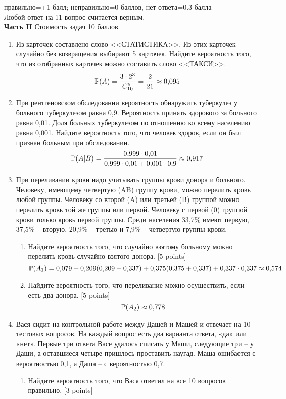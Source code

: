 \documentclass[pdftex,12pt,a4paper]{article}
\begin{document}
правильно=+1 балл; неправильно=0 баллов, нет ответа=0.3 балла \\
Любой ответ на 11 вопрос считается верным. \\

\pagebreak \textbf{Часть II} Стоимость задач 10 баллов. \\

\begin{enumerate}
\item Из карточек составлено слово <<СТАТИСТИКА>>. Из этих карточек случайно без возвращения  выбирают 5 карточек. Найдите вероятность того, что из отобранных карточек можно составить слово <<ТАКСИ>>.
\begin{equation}
\P(A)=\frac{3\cdot 2^3}{C_{10}^{5}}=\frac{2}{21}\approx 0{,}095
\end{equation}

\item При рентгеновском обследовании вероятность обнаружить туберкулез у больного туберкулезом равна 0{,}9. Вероятность принять здорового за больного равна 0{,}01. Доля больных туберкулезом по отношению ко всему населению равна 0{,}001. Найдите вероятность того, что человек здоров, если он был признан больным при обследовании.
\begin{equation}
\P(A|B)=\frac{0{,}999\cdot 0{,}01}{0{,}999\cdot 0{,}01+0{,}001\cdot 0{,}9}\approx 0{,}917
\end{equation}
\item При переливании крови надо учитывать группы крови донора и больного. Человеку, имеющему четвертую (AB) группу крови, можно перелить кровь любой группы. Человеку со второй (A) или третьей (B) группой можно перелить кровь той же группы или первой. Человеку с первой (0) группой крови только кровь первой группы. Среди населения 33{,}7\% имеют первую, 37{,}5\% – вторую, 20{,}9\% -- третью и 7{,}9\% – четвертую группы крови.
\begin{enumerate}
\item Найдите вероятность того, что случайно взятому больному можно перелить кровь случайно взятого донора. [5 points]
\begin{equation}
\P(A_1)=0{,}079+0{,}209(0{,}209+0{,}337)+0{,}375(0{,}375+0{,}337)+0{,}337\cdot0{,}337\approx 0{,}574
\end{equation}
\item Найдите вероятность того, что переливание можно осуществить, если есть два донора. [5 points]
\begin{equation}
\P(A_2)\approx 0{,}778
\end{equation}
\end{enumerate}
\item Вася сидит на контрольной работе между Дашей и Машей и отвечает на 10 тестовых вопросов. На каждый вопрос есть два варианта ответа, «да» или «нет». Первые три ответа Васе удалось списать у Маши, следующие три -- у Даши, а оставшиеся четыре пришлось проставить наугад. Маша ошибается с вероятностью 0{,}1, а Даша -- с вероятностью 0{,}7. 
\begin{enumerate}
\item Найдите вероятность того, что Вася ответил на все 10 вопросов правильно. [3 points]


\end{enumerate}
\end{enumerate}
\end{document}
